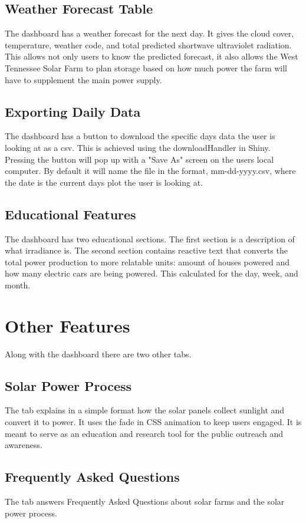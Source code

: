 \documentclass{sigchi}
\begin{document}
\subsection{Weather Forecast Table}
The dashboard has a weather forecast for the next day. It gives the cloud cover, temperature, weather code, and total predicted shortwave ultraviolet radiation. This allows not only users to know the predicted forecast, it also allows the West Tennessee Solar Farm to plan storage based on how much power the farm will have to supplement the main power supply.

\subsection{Exporting Daily Data}
The dashboard has a button to download the specific days data the user is looking at as a csv. This is achieved using the downloadHandler in Shiny.\cite{R-Shiny} Pressing the button will pop up with a "Save As" screen on the users local computer. By default it will name the file in the format, mm-dd-yyyy.csv, where the date is the current days plot the user is looking at.

\subsection{Educational Features}
The dashboard has two educational sections. The first section is a description of what irradiance is. The second section contains reactive text that converts the total power production to more relatable units: amount of houses powered and how many electric cars are being powered. This calculated for the day, week, and month.

\section{Other Features}
Along with the dashboard there are two other tabs.
\subsection{Solar Power Process}
The tab explains in a simple format how the solar panels collect sunlight and convert it to power. It uses the fade in CSS animation to keep users engaged. It is meant to serve as an education and research tool for the public outreach and awareness.
\subsection{Frequently Asked Questions}
The tab answers Frequently Asked Questions about solar farms and the solar power process. 
\end{document}
